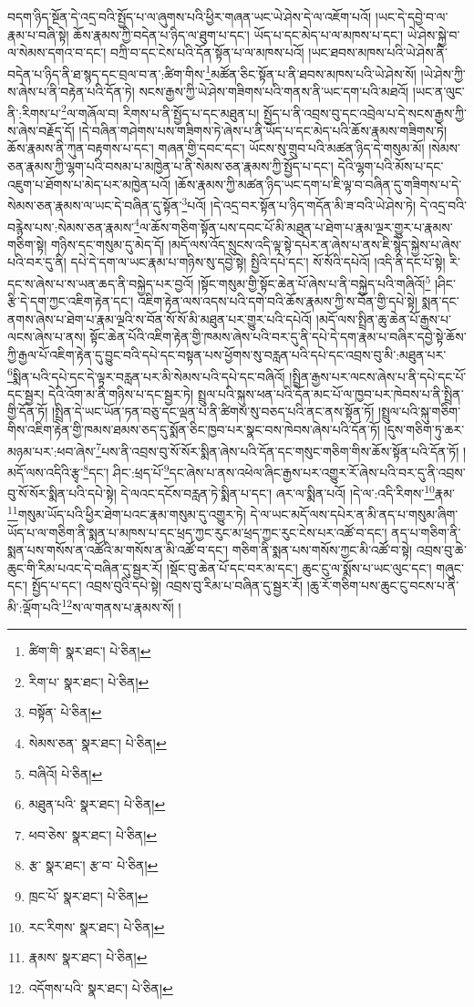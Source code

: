 བདག་ཉིད་སྔོན་དེ་འདྲ་བའི་སྤྱོད་པ་ལ་ཞུགས་པའི་ཕྱིར་གཞན་ཡང་ཡེ་ཤེས་དེ་ལ་འཇོག་པའོ། །ཡང་དེ་དབྱེ་བ་ལ་རྣམ་པ་བཞི་སྟེ། ཆོས་རྣམས་ཀྱི་བདེན་པ་ཉིད་ལ་ཐུག་པ་དང་། ཡོད་པ་དང་མེད་པ་ལ་མཁས་པ་དང་། ཡེ་ཤེས་སྐྱེ་བ་ལ་སེམས་དགའ་བ་དང་། བཀྲི་བ་དང་ངེས་པའི་དོན་སྟོན་པ་ལ་མཁས་པའོ། །ཡང་ཐབས་མཁས་པའི་ཡེ་ཤེས་ནི་བདེན་པ་ཉིད་ནི་ཐ་སྙད་དང་བྲལ་བ་ན་:ཚིག་གིས་\footnote{ཚིག་གི་  སྣར་ཐང་།  པེ་ཅིན། }མཚོན་ཅིང་སྟོན་པ་ནི་ཐབས་མཁས་པའི་ཡེ་ཤེས་སོ། །ཡེ་ཤེས་ཀྱི་ས་ཞེས་པ་ནི་བརྟེན་པའི་དོན་ཏེ། སངས་རྒྱས་ཀྱི་ཡེ་ཤེས་གཟིགས་པའི་གནས་ནི་ཡང་དག་པའི་མཐའོ། །ཡང་ན་ལུང་ནི་:རིགས་པ་\footnote{རིག་པ་  སྣར་ཐང་།  པེ་ཅིན། }ལ་གཞོལ་བ། རིགས་པ་ནི་སྤྱོད་པ་དང་མཐུན་པ། སྤྱོད་པ་ནི་འབྲས་བུ་དང་འབྲེལ་པ་དེ་སངས་རྒྱས་ཀྱི་ས་ཞེས་བརྗོད་དོ། །དེ་བཞིན་གཤེགས་པས་གཟིགས་ཏེ་ཞེས་པ་ནི་ཡོད་པ་དང་མེད་པའི་ཆོས་རྣམས་གཟིགས་ཏེ། ཆོས་རྣམས་ནི་ཀུན་བརྟགས་པ་དང་། གཞན་གྱི་དབང་དང་། ཡོངས་སུ་གྲུབ་པའི་མཚན་ཉིད་དེ་གསུམ་མོ། །སེམས་ཅན་རྣམས་ཀྱི་ལྷག་པའི་བསམ་པ་མཁྱེན་པ་ནི་སེམས་ཅན་རྣམས་ཀྱི་སྤྱོད་པ་དང་། དེའི་ལྷག་པའི་མོས་པ་དང་འཇུག་པ་ཐོགས་པ་མེད་པར་མཁྱེན་པའོ། །ཆོས་རྣམས་ཀྱི་མཚན་ཉིད་ཡང་དག་པ་ཇི་ལྟ་བ་བཞིན་དུ་གཟིགས་པ་དེ་སེམས་ཅན་རྣམས་ལ་ཡང་དེ་བཞིན་དུ་སྟོན་\footnote{བསྟོན་  པེ་ཅིན། }པའོ། །དེ་འདྲ་བར་སྟོན་པ་ཉིད་གདོན་མི་ཟ་བའི་ཡེ་ཤེས་ཏེ། དེ་འདྲ་བའི་བརྙེས་པས་:སེམས་ཅན་རྣམས་\footnote{སེམས་ཅན་  སྣར་ཐང་།  པེ་ཅིན། }ལ་ཆོས་གཅིག་སྟོན་པས་དབང་པོ་མི་མཐུན་པ་ཐེག་པ་རྣམ་ལྔར་གྱུར་པ་རྣམས་གཅིག་སྟེ། གཉིས་དང་གསུམ་དུ་མེད་དོ། །མདོ་ལས་འོད་སྲུངས་འདི་ལྟ་སྟེ་དཔེར་ན་ཞེས་པ་ནས་ཇི་སྙེད་སྐྱེས་པ་ཞེས་པའི་བར་དུ་ནི། དཔེ་དེ་དག་ལ་ཡང་རྣམ་པ་གཉིས་སུ་དབྱེ་སྟེ། སྤྱིའི་དཔེ་དང་། སོ་སོའི་དཔེའོ། །འདི་ནི་དང་པོ་སྟེ། རི་དང་ས་ཞེས་པ་ས་ཡན་ཆད་ནི་བསྐྱེད་པར་བྱའོ། །སྟོང་གསུམ་གྱི་སྟོང་ཆེན་པོ་ཞེས་པ་ནི་བསྐྱེད་པའི་གཞིའོ།\footnote{བཞིའོ།  པེ་ཅིན། } །ཤིང་རྩི་དེ་དག་ཀྱང་འཇིག་རྟེན་དང་། འཇིག་རྟེན་ལས་འདས་པའི་དགེ་བའི་ཆོས་རྣམས་ཀྱི་ས་བོན་གྱི་དཔེ་སྟེ། སྨན་དང་ནགས་ཞེས་པ་ཐེག་པ་རྣམ་ལྔའི་ས་བོན་སོ་སོ་མི་མཐུན་པར་གྱུར་པའི་དཔེའོ། །མདོ་ལས་སྤྲིན་ཆུ་ཆེན་པོ་རྒྱས་པ་ལངས་ཞེས་པ་ནས། སྟོང་ཆེན་པོའི་འཇིག་རྟེན་གྱི་ཁམས་ཞེས་པའི་བར་དུ་ནི་དཔེ་དེ་དག་རྣམ་པ་བཞིར་དབྱེ་སྟེ་ཆོས་ཀྱི་རྒྱལ་པོ་འཇིག་རྟེན་དུ་བྱུང་བའི་དཔེ་དང་བསྟན་པས་ཕྱོགས་སུ་བརླན་པའི་དཔེ་དང་འབྲས་བུ་མི་:མཐུན་པར་\footnote{མཐུན་པའི་  སྣར་ཐང་།  པེ་ཅིན། }སྨིན་པའི་དཔེ་དང་དེ་ལྟར་བརླན་པར་མི་སེམས་པའི་དཔེ་དང་བཞིའོ། །སྤྲིན་རྒྱས་པར་ལངས་ཞེས་པ་ནི་དཔེ་དང་པོ་དང་སྦྱར། དེའི་འོག་མ་ནི་གཉིས་པ་དང་སྦྱར་ཏེ། སྤྲུལ་པའི་སྐུས་ཕན་པའི་དོན་མང་པོ་ལ་ཁྱབ་པར་ཁེབས་པ་ནི་སྤྲིན་གྱི་དོན་ཏོ། །སྤྲིན་དེ་ཡང་ཡོན་ཏན་བཅུ་དང་ལྡན་པ་ནི་ཚིགས་སུ་བཅད་པའི་ནང་ནས་སྟོན་ཏོ། །སྤྲུལ་པའི་སྐུ་གཅིག་གིས་འཇིག་རྟེན་གྱི་ཁམས་ཐམས་ཅད་དུ་སྨོན་ཅིང་ཁྱབ་པར་སྣང་བས་ཁེབས་ཞེས་པའི་དོན་ཏོ། །དུས་གཅིག་ཏུ་ཆར་མཉམ་པར་:ཕབ་ཞེས་\footnote{ཕབ་ཅེས་  སྣར་ཐང་།  པེ་ཅིན། }པས་ནི་འབྲས་བུ་སོ་སོར་སྨིན་ཞེས་པའི་དོན་དང་གསུང་གཅིག་གིས་ཆོས་སྟོན་པའི་དོན་ཏོ། །མདོ་ལས་འདིའི་རྩྭ་\footnote{རྩ་  སྣར་ཐང་། རྩ་བ་  པེ་ཅིན། }དང་། ཤིང་:ཕྲད་པོ་\footnote{ཁྲང་པོ་  སྣར་ཐང་།  པེ་ཅིན། }དང་ཞེས་པ་ནས་འཕེལ་ཞིང་རྒྱས་པར་འགྱུར་རོ་ཞེས་པའི་བར་དུ་ནི་འབྲས་བུ་སོ་སོར་སྨིན་པའི་དཔེ་སྟེ། དེ་ལའང་དངོས་བརླན་ཏེ་སྨིན་པ་དང་། ཞར་ལ་སྨིན་པའོ། །དེ་ལ་:འདི་རིགས་\footnote{རང་རིགས་  སྣར་ཐང་།  པེ་ཅིན། }རྣམ་\footnote{རྣམས་  སྣར་ཐང་།  པེ་ཅིན། }གསུམ་ཡོད་པའི་ཕྱིར་ཐེག་པའང་རྣམ་གསུམ་དུ་འགྱུར་ཏེ། དེ་ལ་ཡང་མདོ་ལས་དཔེར་ན་མི་ནད་པ་གསུམ་ཞིག་ཡོད་པ་ལ་གཅིག་ནི་སྨན་པ་མཁས་པ་དང་ཕྲད་ཀྱང་རུང་མ་ཕྲད་ཀྱང་རུང་ངེས་པར་འཚོ་བ་དང་། ནད་པ་གཅིག་ནི་སྨན་པས་གསོས་ན་འཚོའི་མ་གསོས་ན་མི་འཚོ་བ་དང་། གཅིག་ནི་སྨན་པས་གསོས་ཀྱང་མི་འཚོ་བ་སྟེ། འབྲས་བུ་ཆེ་ཆུང་གི་རིམ་པའང་དེ་བཞིན་དུ་སྦྱར་རོ། །སྡོང་བུ་ཆེན་པོ་དང་བར་མ་དང་། ཆུང་ངུ་ལ་སྨོས་པ་ཡང་ལུང་དང་། གཞུང་དང་། སྤྱོད་པ་དང་། འབྲས་བུའི་དཔེ་སྟེ། འབྲས་བུ་རིམ་པ་བཞིན་དུ་སྦྱར་རོ། །ཆུ་རོ་གཅིག་པས་ཆུང་ངུ་བངས་པ་ནི་མི་:ལྡོག་པའི་\footnote{འདོགས་པའི་  སྣར་ཐང་།  པེ་ཅིན། }ས་ལ་གནས་པ་རྣམས་སོ། །
